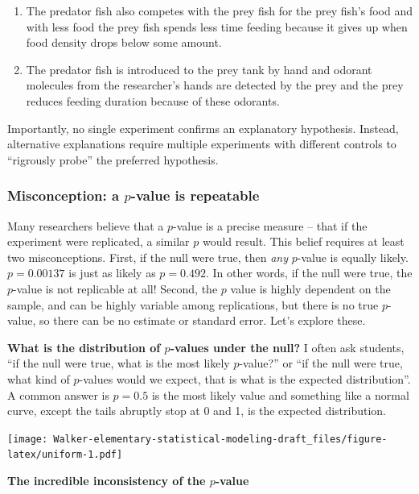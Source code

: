 \documentclass[]{book}
\providecommand{\tightlist}{%
  \setlength{\itemsep}{0pt}\setlength{\parskip}{0pt}}
\theoremstyle{definition}
\theoremstyle{definition}
\theoremstyle{definition}
\theoremstyle{remark}
\begin{document}
\begin{enumerate}
\def\labelenumi{\arabic{enumi}.}
\tightlist
\item
  The predator fish also competes with the prey fish for the prey fish's
  food and with less food the prey fish spends less time feeding because
  it gives up when food density drops below some amount.
\item
  The predator fish is introduced to the prey tank by hand and odorant
  molecules from the researcher's hands are detected by the prey and the
  prey reduces feeding duration because of these odorants.
\end{enumerate}

Importantly, no single experiment confirms an explanatory hypothesis.
Instead, alternative explanations require multiple experiments with
different controls to ``rigrously probe'' the preferred hypothesis.

\subsubsection{\texorpdfstring{Misconception: a \(p\)-value is
repeatable}{Misconception: a p-value is repeatable}}\label{misconception-a-p-value-is-repeatable}

Many researchers believe that a \(p\)-value is a precise measure -- that
if the experiment were replicated, a similar \(p\) would result. This
belief requires at least two misconceptions. First, if the null were
true, then \emph{any} \(p\)-value is equally likely. \(p=0.00137\) is
just as likely as \(p=0.492\). In other words, if the null were true,
the \(p\)-value is not replicable at all! Second, the \(p\) value is
highly dependent on the sample, and can be highly variable among
replications, but there is no true \(p\)-value, so there can be no
estimate or standard error. Let's explore these.

\textbf{What is the distribution of \(p\)-values under the null?} I
often ask students, ``if the null were true, what is the most likely
\(p\)-value?'' or ``if the null were true, what kind of \(p\)-values
would we expect, that is what is the expected distribution''. A common
answer is \(p=0.5\) is the most likely value and something like a normal
curve, except the tails abruptly stop at 0 and 1, is the expected
distribution.

\texttt{[image: Walker-elementary-statistical-modeling-draft\_files/figure-latex/uniform-1.pdf]}

\textbf{The incredible inconsistency of the \(p\)-value}
\end{document}
